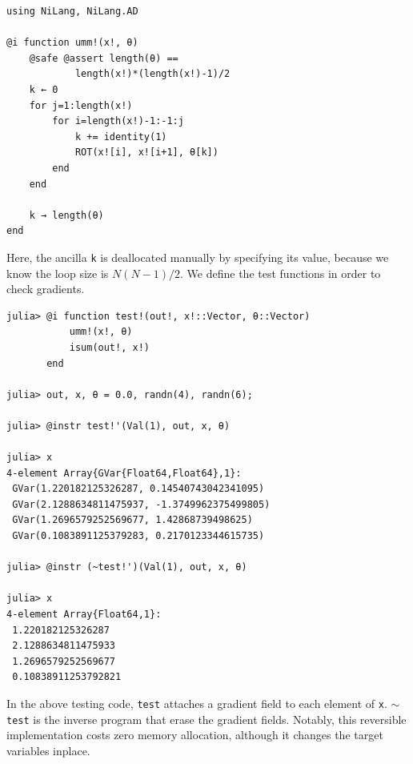 \documentclass{article}
\newcommand{\<}{\langle}
\renewcommand{\>}{\rangle}
\newcommand{\Tr}{{\rm Tr}}
\theoremstyle{definition}\newtheorem{definition}{\textit{Definition}}
\begin{document}
\begin{minipage}{.88\columnwidth}
\begin{lstlisting}[mathescape=true]
using NiLang, NiLang.AD

@i function umm!(x!, θ)
    @safe @assert length(θ) == 
            length(x!)*(length(x!)-1)/2
    k ← 0
    for j=1:length(x!)
        for i=length(x!)-1:-1:j
            k += identity(1)
            ROT(x![i], x![i+1], θ[k])
        end
    end

    k → length(θ)
end
\end{lstlisting}
\end{minipage}

Here, the ancilla \texttt{k} is deallocated manually by specifying its value, because we know the loop size is $N(N-1)/2$.
We define the test functions in order to check gradients.

\begin{minipage}{\columnwidth}
\begin{lstlisting}[mathescape=true,multicols=2]
julia> @i function test!(out!, x!::Vector, θ::Vector)
           umm!(x!, θ)
           isum(out!, x!)
       end

julia> out, x, θ = 0.0, randn(4), randn(6);

julia> @instr test!'(Val(1), out, x, θ)

julia> x
4-element Array{GVar{Float64,Float64},1}:
 GVar(1.220182125326287, 0.14540743042341095) 
 GVar(2.1288634811475937, -1.3749962375499805)
 GVar(1.2696579252569677, 1.42868739498625)   
 GVar(0.1083891125379283, 0.2170123344615735) 

julia> @instr (~test!')(Val(1), out, x, θ)

julia> x
4-element Array{Float64,1}:
 1.220182125326287  
 2.1288634811475933 
 1.2696579252569677 
 0.10838911253792821
\end{lstlisting}
\end{minipage}

In the above testing code, \texttt{test\textquotesingle} attaches a gradient field to each element of \texttt{x}. \texttt{$\sim$test\textquotesingle} is the inverse program that erase the gradient fields.
Notably, this reversible implementation costs zero memory allocation, although it changes the target variables inplace.

\end{document}
